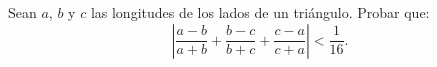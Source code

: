 Sean $a$, $b$ y $c$ las longitudes de los lados de un triángulo. Probar que:
\[\left|\frac{a-b}{a+b}+\frac{b-c}{b+c}+\frac{c-a}{c+a}\right|\lt\frac{1}{16}.\]